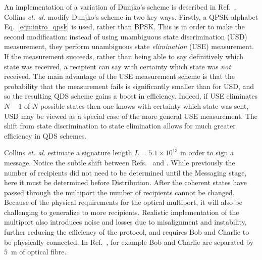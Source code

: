 An implementation of a variation of Dunjko's scheme is described in Ref.~\cite{Collins2014}. Collins \emph{et. al.} modify Dunjko's scheme in two key ways. Firstly, a QPSK alphabet Eq.~\ref{eqn:intro_qpsk} is used, rather than BPSK. This is in order to make the second modification: instead of using unambiguous state discrimination (USD) measurement, they perform unambiguous state \emph{elimination} (USE) measurement. If the measurement succeeds, rather than being able to say definitively which state was received, a recipient can say with certainty which state was \emph{not} received. %
The main advantage of the USE measurement scheme is that the probability that the measurement fails is significantly smaller than for USD, and so the resulting QDS scheme gains a boost in efficiency. Indeed, if USE eliminates $N-1$ of $N$ possible states then one knows with certainty which state was sent, USD may be viewed as a special case of the more general USE measurement. The shift from state discrimination to state elimination allows for much greater efficiency in QDS schemes. %


Collins \emph{et. al.} estimate a signature length $L = 5.1 \times 10^{13}$ in order to sign a message. Notice the subtle shift between Refs.~\cite{Gottesman2001} and \cite{Andersson2006, Clarke2012, Dunjko2014, Collins2014}. While previously the number of recipients did not need to be determined until the Messaging stage, here it must be determined before Distribution. After the coherent states have passed through the multiport the number of recipients cannot be changed. 
Because of the physical requirements for the optical multiport, it will also be challenging to generalize to more recipients. %
Realistic implementation of the multiport also introduces noise and losses due to misalignment and instability, further reducing the efficiency of the protocol, and requires Bob and Charlie to be physically connected. In Ref.~\cite{Clarke2012, Collins2014}, for example Bob and Charlie are separated by $5$~m of optical fibre. 

